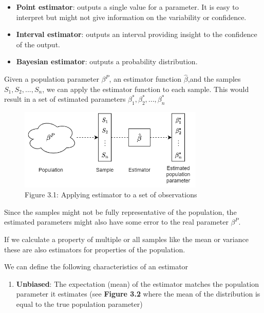\begin{itemize}
    \item \textbf{Point estimator}: outputs a single value for a parameter. It is easy to interpret but might not give information on the variability or confidence.
    \item \textbf{Interval estimator}: outputs an interval providing insight to the confidence of the output.
    \item \textbf{Bayesian estimator}: outputs a probability distribution.
\end{itemize}

Given a population parameter \(\beta^P\), an estimator function \(\hat \beta\),and the samples \(S_1, S_2, ..., S_n\), we can apply the estimator function to each sample. This would result in a set of estimated parameters \(\beta^*_1, \beta^*_2, ..., \beta^*_n\)


\begin{figure}[htbp]
    \begin{center}
        \includegraphics[width=250pt]{../img/03-estimator.png}
        \caption{Figure 3.1: Applying estimator to a set of observations}
    \end{center}
\end{figure}


Since the samples might not be fully representative of the population, the estimated parameters might also have some error to the real parameter \(\beta^P\).

If we calculate a property of multiple or all samples like the mean or variance these are also estimators for properties of the population.

We can define the following characteristics of an estimator

\begin{enumerate}
    \item \textbf{Unbiased}: The expectation (mean) of the estimator matches the population parameter it estimates (see \textbf{Figure 3.2} where the mean of the distribution is equal to the true population parameter)
\end{enumerate}

